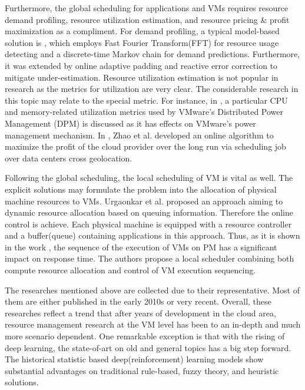 \documentclass[sigchi]{acmart}
\begin{document}
Furthermore, the global scheduling for applications and VMs requires resource demand profiling, resource utilization estimation, and resource pricing \& profit maximization as a compliment.
For demand profiling, a typical model-based solution is \cite{gong2010press}, which employs Fast Fourier Transform(FFT) for resource usage detecting and a discrete-time Markov chain for demand predictions.
Furthermore, it was extended by online adaptive padding and reactive error correction to mitigate under-estimation\cite{shen2011cloudscale}.
Resource utilization estimation is not popular in research as the metrics for utilization are very clear.
The considerable research in this topic may relate to the special metric. 
For instance, in \cite{gmach2011chargeback}, a particular CPU and memory-related utilization metrics used by VMware’s Distributed Power Management (DPM) is discussed as it has effects on VMware’s power management mechanism.
In \cite{6847931}, Zhao et al. developed an online algorithm to maximize the profit of the cloud provider over the long run via scheduling job over data centers cross geolocation.

Following the global scheduling, the local scheduling of VM is vital as well.
The explicit solutions may formulate the problem into the allocation of physical machine resources to VMs.
Urgaonkar et al. proposed an approach aiming to dynamic resource allocation based on queuing information. Therefore the online control is achieve\cite{5488484}.
Each physical machine is equipped with a resource controller and a buffer(queue) containing applications in this approach.
Thus, as it is shown in the work \cite{6195591}, the sequence of the execution of VMs on PM has a significant impact on response time.
The authors propose a local scheduler combining both compute resource allocation and control of VM execution sequencing.

The researches mentioned above are collected due to their representative. Most of them are either published in the early 2010s or very recent.
Overall, these researches reflect a trend that after years of development in the cloud area, resource management research at the VM level has been to an in-depth and much more scenario dependent.
One remarkable exception is that with the rising of deep learning, the state-of-art on old and general topics has a big step forward.
The historical statistic based deep(reinforcement) learning models show substantial advantages on traditional rule-based, fuzzy theory, and heuristic solutions.
\end{document}
